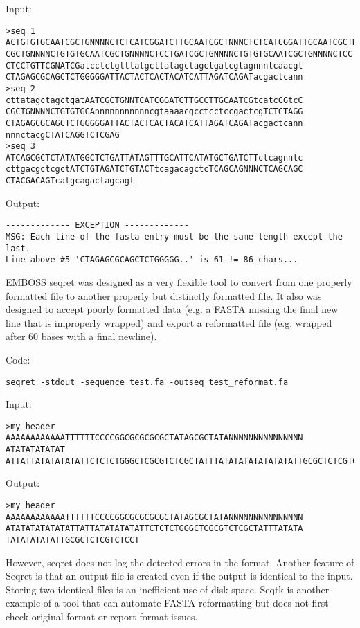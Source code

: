 \documentclass{bmcart}
\begin{document}
Input: 
\begin{verbatim}
>seq 1
ACTGTGTGCAATCGCTGNNNNCTCTCATCGGATCTTGCAATCGCTNNNCTCTCATCGGATTGCAATCGCTNNNCTtcatcCGGAT
CGCTGNNNNCTGTGTGCAATCGCTGNNNNCTCCTGATCGCTGNNNNCTGTGTGCAATCGCTGNNNNCTCCTGCAATCGCTGNNNN
CTCCTGTTCGNATCGatcctctgtttatgcttatagctagctgatcgtagnnntcaacgt
CTAGAGCGCAGCTCTGGGGGATTACTACTCACTACATCATTAGATCAGATacgactcann
>seq 2
cttatagctagctgatAATCGCTGNNTCATCGGATCTTGCCTTGCAATCGtcatcCGtcC
CGCTGNNNNCTGTGTGCAnnnnnnnnnnncgtaaaacgcctcctccgactcgTCTCTAGG
CTAGAGCGCAGCTCTGGGGGATTACTACTCACTACATCATTAGATCAGATacgactcann
nnnctacgCTATCAGGTCTCGAG
>seq 3
ATCAGCGCTCTATATGGCTCTGATTATAGTTTGCATTCATATGCTGATCTTctcagnntc
cttgacgctcgctATCTGTAGATCTGTACTtcagacagctcTCAGCAGNNNCTCAGCAGC
CTACGACAGTcatgcagactagcagt
\end{verbatim}

Output:
\begin{verbatim}
------------- EXCEPTION -------------
MSG: Each line of the fasta entry must be the same length except the last. 
Line above #5 'CTAGAGCGCAGCTCTGGGGG..' is 61 != 86 chars...
\end{verbatim}

EMBOSS seqret was designed as a very flexible tool to convert from one properly formatted file to another properly but distinctly formatted file. It also was designed to accept poorly formatted data (e.g. a FASTA missing the final new line that is improperly wrapped) and export a reformatted file (e.g. wrapped after 60 bases with a final newline).

Code:

\begin{verbatim}
seqret -stdout -sequence test.fa -outseq test_reformat.fa
\end{verbatim}

Input:

\begin{verbatim}
>my header
AAAAAAAAAAAATTTTTTCCCCGGCGCGCGCGCTATAGCGCTATANNNNNNNNNNNNNNN
ATATATATATAT
ATTATTATATATATATTCTCTCTGGGCTCGCGTCTCGCTATTTATATATATATATATATTGCGCTCTCGTCTCCT\end{verbatim}

Output:

\begin{verbatim}
>my header
AAAAAAAAAAAATTTTTTCCCCGGCGCGCGCGCTATAGCGCTATANNNNNNNNNNNNNNN
ATATATATATATATTATTATATATATATTCTCTCTGGGCTCGCGTCTCGCTATTTATATA
TATATATATATTGCGCTCTCGTCTCCT
\end{verbatim}

However, seqret does not log the detected errors in the format. Another feature of Seqret is that an output file is created even if the output is identical to the input. Storing two identical files is an inefficient use of disk space. Seqtk \cite{Li2013} is another example of a tool that can automate FASTA reformatting but does not first check original format or report format issues. 
\end{document}
